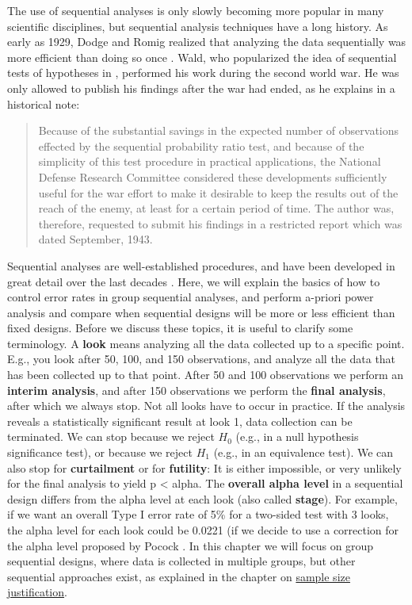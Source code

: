 \documentclass[
  oneside]{book}
\begin{document}
The use of sequential analyses is only slowly becoming more popular in many scientific disciplines, but sequential analysis techniques have a long history. As early as 1929, Dodge and Romig realized that analyzing the data sequentially was more efficient than doing so once \citep{dodge_method_1929}. Wald, who popularized the idea of sequential tests of hypotheses in \citeyearpar{wald_sequential_1945}, performed his work during the second world war. He was only allowed to publish his findings after the war had ended, as he explains in a historical note:

\begin{quote}
Because of the substantial savings in the expected number of observations effected by the sequential probability ratio test, and because of the simplicity of this test procedure in practical applications, the National Defense Research Committee considered these developments sufficiently useful for the war effort to make it desirable to keep the results out of the reach of the enemy, at least for a certain period of time. The author was, therefore, requested to submit his findings in a restricted report which was dated September, 1943.
\end{quote}

Sequential analyses are well-established procedures, and have been developed in great detail over the last decades \citep{proschan_statistical_2006, jennison_group_2000, wassmer_group_2016}. Here, we will explain the basics of how to control error rates in group sequential analyses, and perform a-priori power analysis and compare when sequential designs will be more or less efficient than fixed designs. Before we discuss these topics, it is useful to clarify some terminology. A \textbf{look} means analyzing all the data collected up to a specific point. E.g., you look after 50, 100, and 150 observations, and analyze all the data that has been collected up to that point. After 50 and 100 observations we perform an \textbf{interim analysis}, and after 150 observations we perform the \textbf{final analysis}, after which we always stop. Not all looks have to occur in practice. If the analysis reveals a statistically significant result at look 1, data collection can be terminated. We can stop because we reject \(H_0\) (e.g., in a null hypothesis significance test), or because we reject \(H_1\) (e.g., in an equivalence test). We can also stop for \textbf{curtailment} or for \textbf{futility}: It is either impossible, or very unlikely for the final analysis to yield p \textless{} alpha. The \textbf{overall alpha level} in a sequential design differs from the alpha level at each look (also called \textbf{stage}). For example, if we want an overall Type I error rate of 5\% for a two-sided test with 3 looks, the alpha level for each look could be 0.0221 (if we decide to use a correction for the alpha level proposed by Pocock \citep{pocock_group_1977}. In this chapter we will focus on group sequential designs, where data is collected in multiple groups, but other sequential approaches exist, as explained in the chapter on \protect\hyperlink{sequentialsamplesize}{sample size justification}.
\end{document}
